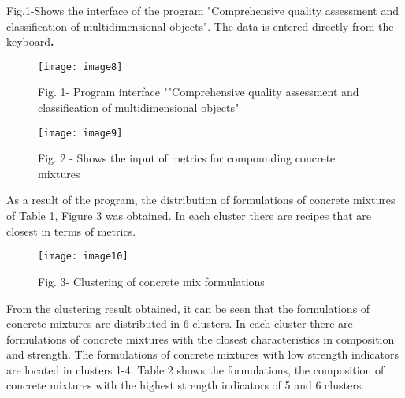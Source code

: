 Fig.1-Shows the interface of the program "Comprehensive quality
assessment and classification of multidimensional objects". The data is
entered directly from the keyboard{\bfseries .}

\begin{figure}
  \centering
  \texttt{[image: image8]}
  \caption*{Fig. 1- Program interface ""Comprehensive quality assessment and
classification of multidimensional objects"}
\end{figure}

\begin{figure}
  \centering
  \texttt{[image: image9]}
  \caption*{Fig. 2 - Shows the input of metrics for compounding concrete mixtures}
\end{figure}

As a result of the program, the distribution of formulations of concrete
mixtures of Table 1, Figure 3 was obtained. In each cluster there are
recipes that are closest in terms of metrics.

\begin{figure}
  \centering
  \texttt{[image: image10]}
  \caption*{Fig. 3- Clustering of concrete mix formulations}
\end{figure}

From the clustering result obtained, it can be seen that the
formulations of concrete mixtures are distributed in 6 clusters. In each
cluster there are formulations of concrete mixtures with the closest
characteristics in composition and strength. The formulations of
concrete mixtures with low strength indicators are located in clusters
1-4. Table 2 shows the formulations, the composition of concrete
mixtures with the highest strength indicators of 5 and 6 clusters.



